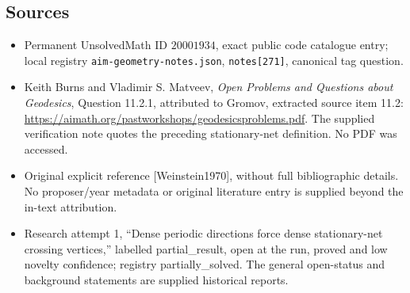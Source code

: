 \documentclass[11pt]{article}
\begin{document}
\subsection{Sources}
\begin{itemize}
\item Permanent UnsolvedMath ID \(20001934\), exact public code catalogue entry; local registry \texttt{aim-geometry-notes.json}, \texttt{notes[271]}, canonical tag question.
\item Keith Burns and Vladimir S. Matveev, \emph{Open Problems and Questions about Geodesics}, Question 11.2.1, attributed to Gromov, extracted source item 11.2: \url{https://aimath.org/pastworkshops/geodesicsproblems.pdf}. The supplied verification note quotes the preceding stationary-net definition. No PDF was accessed.
\item Original explicit reference [Weinstein1970], without full bibliographic details. No proposer/year metadata or original literature entry is supplied beyond the in-text attribution.
\item Research attempt 1, ``Dense periodic directions force dense stationary-net crossing vertices,'' labelled partial\_result, open at the run, proved and low novelty confidence; registry partially\_solved. The general open-status and background statements are supplied historical reports.
\end{itemize}
\end{document}
